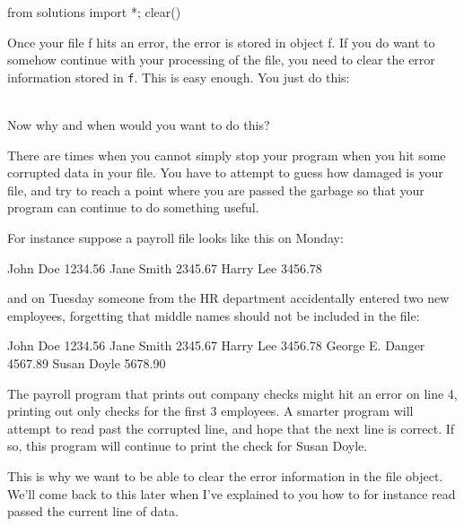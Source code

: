 \begin{python0}
from solutions import *; clear()
\end{python0}

Once your file f hits an error, the error is stored in object f. If you do want to somehow continue with your processing of the file, you need to clear the error information stored in \texttt{f}. This is easy enough. You just do this:

\\

Now why and when would you want to do this?

There are times when you cannot simply stop your program when you hit
some corrupted data in your file. You have to attempt to guess how
damaged is your file, and try to reach a point where you are passed the
garbage so that your program can continue to do something useful.

For instance suppose a payroll file looks like this on Monday:

\begin{console}
John Doe 1234.56
Jane Smith 2345.67
Harry Lee 3456.78
\end{console}

and on Tuesday someone from the HR department accidentally entered two
new employees, forgetting that middle names should not be included in
the file:

\begin{console}
John Doe 1234.56
Jane Smith 2345.67
Harry Lee 3456.78
George E. Danger 4567.89
Susan Doyle 5678.90
\end{console}

The payroll program that prints out company checks might hit an error on line 4, printing out only checks for the first 3 employees. A smarter program will attempt to read past the corrupted line, and hope that the next line is correct. If so, this program will continue to print the check for Susan Doyle.

This is why we want to be able to clear the error information in the file object. We'll come back to this later when I've explained to you how to for instance read passed the current line of data.

